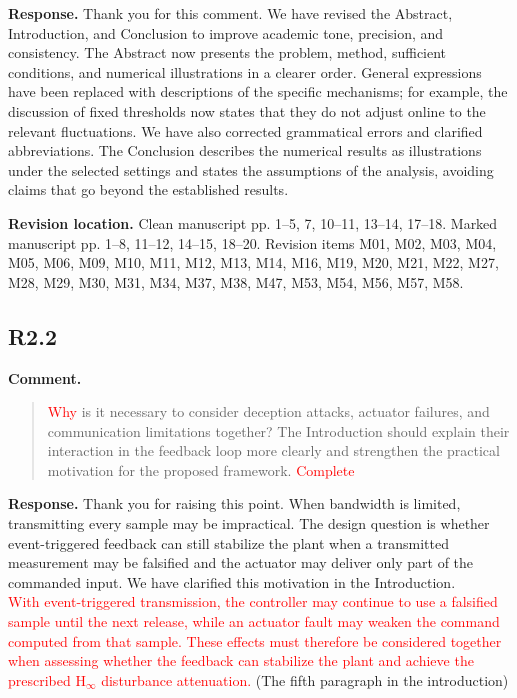 \documentclass[12pt,a4paper]{article}
\begin{document}
\textbf{Response.}
Thank you for this comment. We have revised the Abstract, Introduction, and Conclusion to improve academic tone, precision, and consistency. The Abstract now presents the problem, method, sufficient conditions, and numerical illustrations in a clearer order. General expressions have been replaced with descriptions of the specific mechanisms; for example, the discussion of fixed thresholds now states that they do not adjust online to the relevant fluctuations. We have also corrected grammatical errors and clarified abbreviations. The Conclusion describes the numerical results as illustrations under the selected settings and states the assumptions of the analysis, avoiding claims that go beyond the established results.


\textbf{Revision location.} Clean manuscript pp. 1–5, 7, 10–11, 13–14, 17–18. Marked manuscript pp. 1–8, 11–12, 14–15, 18–20. Revision items M01, M02, M03, M04, M05, M06, M09, M10, M11, M12, M13, M14, M16, M19, M20, M21, M22, M27, M28, M29, M30, M31, M34, M37, M38, M47, M53, M54, M56, M57, M58.

\subsection*{R2.2}

\textbf{Comment.}
\begin{quote}
\raggedright
\textcolor{red}{Why} is it necessary to consider deception attacks, actuator failures, and communication limitations together? The Introduction should explain their interaction in the feedback loop more clearly and strengthen the practical motivation for the proposed framework. \textcolor{red}{Complete}
\end{quote}

\textbf{Response.}
Thank you for raising this point. When bandwidth is limited, transmitting every sample may be impractical. The design question is whether event-triggered feedback can still stabilize the plant when a transmitted measurement may be falsified and the actuator may deliver only part of the commanded input. We have clarified this motivation in the Introduction.\\

\textcolor{red}{With event-triggered transmission, the controller may continue to use a falsified sample until the next release, while an actuator fault may weaken the command computed from that sample. These effects must therefore be considered together when assessing whether the feedback can stabilize the plant and achieve the prescribed $\mathrm{H}_\infty$ disturbance attenuation.} (The fifth paragraph in the introduction)
\end{document}
